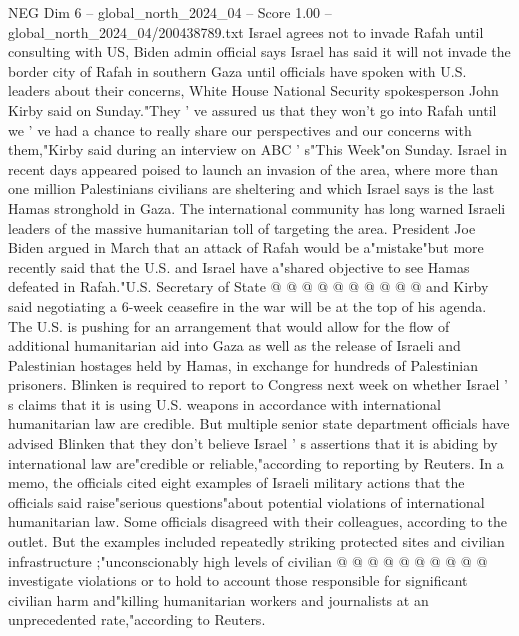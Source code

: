 \begin{textsample}{NEG Dim 6 – global\_north\_2024\_04 – Score 1.00 – global\_north\_2024\_04/200438789.txt}  \label{ex:f6_neg_373}
Israel agrees not to invade Rafah until consulting with US, Biden admin official says Israel has said it will not invade the border city of Rafah in southern Gaza until officials have spoken with U.S. leaders about their concerns, White House National Security spokesperson John Kirby said on Sunday."They ' ve assured us that they won't go into Rafah until we ' ve had a chance to really share our perspectives and our concerns with them,"Kirby said during an interview on ABC ' s"This Week"on Sunday.
Israel in recent days appeared poised to launch an invasion of the area, where more than one million Palestinians civilians are sheltering and which Israel says is the last Hamas stronghold in Gaza.
The international community has long warned Israeli leaders of the massive humanitarian toll of targeting the area.
President Joe Biden argued in March that an attack of Rafah would be a"mistake"but more recently said that the U.S. and Israel have a"shared objective to see Hamas defeated in Rafah."U.S.
Secretary of State @ @ @ @ @ @ @ @ @ @ and Kirby said negotiating a 6-week ceasefire in the war will be at the top of his agenda.
The U.S. is pushing for an arrangement that would allow for the flow of additional humanitarian aid into Gaza as well as the release of Israeli and Palestinian hostages held by Hamas, in exchange for hundreds of Palestinian prisoners.
Blinken is required to report to Congress next week on whether Israel ' s claims that it is using U.S. weapons in accordance with international humanitarian law are credible.
But multiple senior state department officials have advised Blinken that they don't believe Israel ' s assertions that it is abiding by international law are"credible or reliable,"according to reporting by Reuters.
In a memo, the officials cited eight examples of Israeli military actions that the officials said raise"serious questions"about potential violations of international humanitarian law.
Some officials disagreed with their colleagues, according to the outlet.
But the examples included repeatedly striking protected sites and civilian infrastructure ;"unconscionably high levels of civilian @ @ @ @ @ @ @ @ @ @ investigate violations or to hold to account those responsible for significant civilian harm and"killing humanitarian workers and journalists at an unprecedented rate,"according to Reuters.

\end{textsample}
